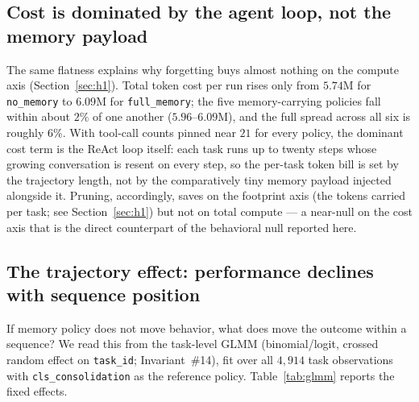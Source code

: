 \subsection{Cost is dominated by the agent loop, not the memory payload}

The same flatness explains why forgetting buys almost nothing on the compute axis
(Section~\ref{sec:h1}). Total token cost per run rises only from $5.74$M for
\texttt{no\_memory} to $6.09$M for \texttt{full\_memory}; the five memory-carrying policies
fall within about $2\%$ of one another ($5.96$--$6.09$M), and the full spread across all
six is roughly $6\%$. With tool-call counts pinned near $21$ for every policy, the
dominant cost term is the ReAct loop itself: each task runs up to twenty steps whose
growing conversation is resent on every step, so the per-task token bill is set by the
trajectory length, not by the comparatively tiny memory payload injected alongside it.
Pruning, accordingly, saves on the footprint axis (the tokens carried per task; see
Section~\ref{sec:h1}) but not on total compute --- a near-null on the cost axis that is the
direct counterpart of the behavioral null reported here.

\subsection{The trajectory effect: performance declines with sequence position}

If memory policy does not move behavior, what does move the outcome within a sequence? We
read this from the task-level GLMM (binomial/logit, crossed random effect on
\texttt{task\_id}; Invariant~\#14), fit over all $4{,}914$ task observations with
\texttt{cls\_consolidation} as the reference policy. Table~\ref{tab:glmm} reports the fixed
effects.

